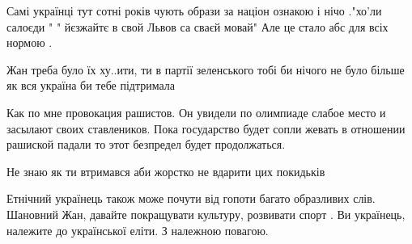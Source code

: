 \begin{itemize}
 

Самі українці тут сотні років чують образи за націон ознакою і нічо ."хо'ли
салоєди " " йєзжайтє в свой Львов са сваєй мовай" Але це стало абс для всіх
нормою .

 

Жан треба було їх ху..ити, ти в партії зеленського тобі би нічого не було
більше як вся україна би тебе підтримала


 

Как по мне провокация рашистов. Он увидели по олимпиаде слабое место и засылают
своих ставлеников. Пока государство будет сопли жевать в отношении рашиской
падали то этот безпредел будет продолжаться.


 
Не знаю як ти втримався аби жорстко не вдарити цих покидьків

 

Етнічний українець також може почути від гопоти багато образливих слів.
Шановний Жан, давайте покращувати культуру, розвивати спорт . Ви українець,
належите до української еліти. З належною повагою.


 


\end{itemize}
